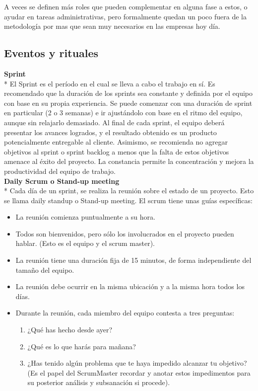 \documentclass[../pfc.tex]{subfiles}
\begin{document}
	A veces se definen más roles que pueden complementar en alguna fase a estos, o ayudar en tareas administrativas, pero formalmente quedan un poco fuera de la metodología por mas que sean muy necesarios en las empresas hoy día.
	
	\subsection{Eventos y rituales}
		
	\textbf{Sprint}\\* 
	El Sprint es el período en el cual se lleva a cabo el trabajo en sí. Es recomendado que la duración de los sprints sea constante y definida por el equipo con base en su propia experiencia. Se puede comenzar con una duración de sprint en particular (2 o 3 semanas) e ir ajustándolo con base en el ritmo del equipo, aunque sin relajarlo demasiado. Al final de cada sprint, el equipo deberá presentar los avances logrados, y el resultado obtenido es un producto potencialmente entregable al cliente. Asimismo, se recomienda no agregar objetivos al sprint o sprint backlog a menos que la falta de estos objetivos amenace al éxito del proyecto. La constancia permite la concentración y mejora la productividad del equipo de trabajo.\\
	
	\textbf{Daily Scrum o Stand-up meeting}\\*
	Cada día de un sprint, se realiza la reunión sobre el estado de un proyecto. Esto se llama daily standup o Stand-up meeting. El scrum tiene unas guías específicas:
	\begin{itemize} 
		\item La reunión comienza puntualmente a su hora. 
		\item Todos son bienvenidos, pero sólo los involucrados en el proyecto pueden hablar. (Esto es el equipo y el scrum master). 
		\item La reunión tiene una duración fija de 15 minutos, de forma independiente del tamaño del equipo.
		\item La reunión debe ocurrir en la misma ubicación y a la misma hora todos los días.
		\item Durante la reunión, cada miembro del equipo contesta a tres preguntas:
		\begin{enumerate}
			\item ¿Qué has hecho desde ayer?
			\item ¿Qué es lo que harás para mañana?
			\item ¿Has tenido algún problema que te haya impedido alcanzar tu objetivo? (Es el papel del ScrumMaster recordar y anotar estos impedimentos para su posterior análisis y subsanación si procede).
		\end{enumerate} 
	\end{itemize}
	
\end{document}
